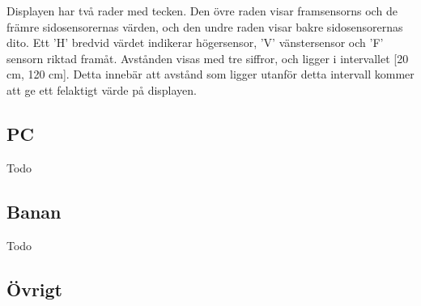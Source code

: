 
Displayen har två rader med tecken. Den övre raden visar framsensorns och de främre sidosensorernas värden, och den undre raden visar bakre sidosensorernas dito. Ett 'H' bredvid värdet indikerar högersensor, 'V' vänstersensor och 'F' sensorn riktad framåt. Avstånden visas med tre siffror, och ligger i intervallet [20 cm, 120 cm]. Detta innebär att avstånd som ligger utanför detta intervall kommer att ge ett felaktigt värde på displayen. 

\subsection{PC}
Todo

\subsection{Banan}
\label{sec:banan}
Todo

\subsection{Övrigt}
